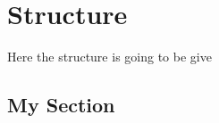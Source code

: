 \chapter{Structure}
\label{chapter:Structure}

Here the structure is going to be give

\section{My Section}


 


